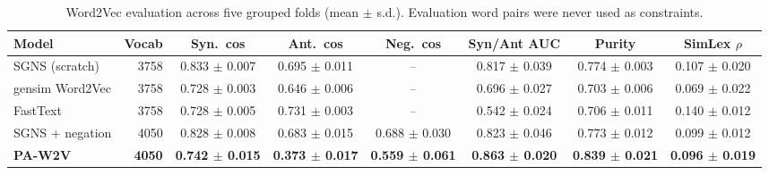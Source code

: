 \begin{table}[H]
\centering
\footnotesize
\caption{Word2Vec evaluation across five grouped folds (mean $\pm$ s.d.). Evaluation word pairs were never used as constraints.}
\label{tab:w2v}
\begin{tabular}{lrcccccc}
\toprule
Model & Vocab & Syn.\ cos & Ant.\ cos & Neg.\ cos & Syn/Ant AUC & Purity & SimLex $\rho$ \\
\midrule
SGNS (scratch) & 3758 & 0.833 $\pm$ 0.007 & 0.695 $\pm$ 0.011 & -- & 0.817 $\pm$ 0.039 & 0.774 $\pm$ 0.003 & 0.107 $\pm$ 0.020 \\
gensim Word2Vec & 3758 & 0.728 $\pm$ 0.003 & 0.646 $\pm$ 0.006 & -- & 0.696 $\pm$ 0.027 & 0.703 $\pm$ 0.006 & 0.069 $\pm$ 0.022 \\
FastText & 3758 & 0.728 $\pm$ 0.005 & 0.731 $\pm$ 0.003 & -- & 0.542 $\pm$ 0.024 & 0.706 $\pm$ 0.011 & 0.140 $\pm$ 0.012 \\
SGNS + negation & 4050 & 0.828 $\pm$ 0.008 & 0.683 $\pm$ 0.015 & 0.688 $\pm$ 0.030 & 0.823 $\pm$ 0.046 & 0.773 $\pm$ 0.012 & 0.099 $\pm$ 0.012 \\
\textbf{PA-W2V} & \textbf{4050} & \textbf{0.742 $\pm$ 0.015} & \textbf{0.373 $\pm$ 0.017} & \textbf{0.559 $\pm$ 0.061} & \textbf{0.863 $\pm$ 0.020} & \textbf{0.839 $\pm$ 0.021} & \textbf{0.096 $\pm$ 0.019} \\
\bottomrule
\end{tabular}
\end{table}